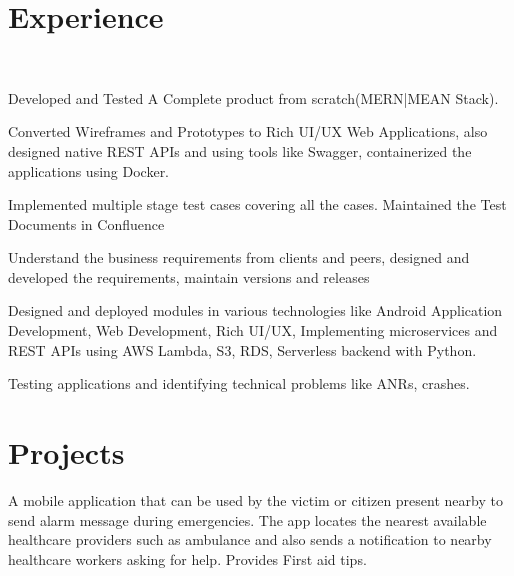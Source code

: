 \documentclass[]{deedy-resume-openfont}
\begin{document}
\hfill
\begin{minipage}[t]{0.66\textwidth} 


\section{Experience}
\sectionsep\\
\sectionsep

\vspace{\topsep} %
\begin{tightemize}
\item Developed and Tested A Complete product from scratch(MERN|MEAN Stack).
\item Converted Wireframes and Prototypes to Rich UI/UX Web Applications, also designed native REST APIs and using tools like Swagger, containerized the applications using Docker. 
\item Implemented multiple stage test cases covering all the cases. Maintained the Test Documents in Confluence
\item Understand the business requirements from clients and peers, designed and developed the requirements, maintain versions and releases 
\end{tightemize}
\sectionsep

\begin{tightemize}
\item Designed and deployed modules in various technologies like Android Application Development, Web Development, Rich UI/UX, Implementing
microservices and REST APIs using AWS Lambda, S3, RDS, Serverless backend with Python.
\item Testing applications and identifying technical problems like ANRs, crashes.
\end{tightemize}
\sectionsep


\section{Projects}
A mobile application that can be used by the victim or
citizen present nearby to send alarm message during emergencies. The app locates the
nearest available healthcare providers such as ambulance and also sends a notification to nearby healthcare workers asking for help. Provides First aid tips.
\sectionsep


\end{minipage}
\end{document}
